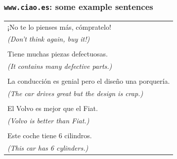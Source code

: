 \documentclass[10pt]{beamer}
\newenvironment{itemwide}%
{\begin{itemize}%
    \setlength{\itemsep}{5pt}%
    \setlength{\parskip}{5pt}}%
  {\end{itemize}}
\begin{document}
\begin{frame}
  \frametitle{\texttt{www.ciao.es}: some example sentences}
\begin{tabular}{l}
 ¡No te lo pienses m\'{a}s, c\'ompratelo! \\
 \textit{(Don't think again, buy it!)} \\ \\
 Tiene muchas piezas defectuosas. \\
 \textit{(It contains many defective parts.)} \\ \\
 La conducci\'{o}n es genial pero el dise\~{n}o una porquer\'{i}a. \\
 \textit{(The car drives great but the design is crap.)} \\ \\
 El Volvo es mejor que el Fiat. \\
 \textit{(Volvo is better than Fiat.)} \\ \\
 Este coche tiene 6 cilindros. \\
 \textit{(This car has 6 cylinders.)}
\end{tabular}


\end{frame}
\end{document}
